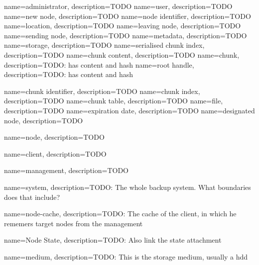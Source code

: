 {
	name={administrator},
	description={TODO}
}
{
	name={user},
	description={TODO}
}
{
	name={new node},
	description={TODO}
}
{
	name={node identifier},
	description={TODO}
}
{
	name={location},
	description={TODO}
}
{
	name={leaving node},
	description={TODO}
}
{
	name={sending node},
	description={TODO}
}
{
	name={metadata},
	description={TODO}
}
{
	name={storage},
	description={TODO}
}
{
	name={serialised chunk index},
	description={TODO}
}
{
	name={chunk content},
	description={TODO}
}
{
	name={chunk},
	description={TODO: has content and hash}
}
{
	name={root handle},
	description={TODO: has content and hash}
}

{
	name={chunk identifier},
	description={TODO}
}
{
	name={chunk index},
	description={TODO}
}
{
	name={chunk table},
	description={TODO}
}
{
	name={file},
	description={TODO}
}
{
	name={expiration date},
	description={TODO}
}
{
	name={designated node},
	description={TODO}
}

{
	name={node},
	description={TODO}
}

{
	name={client},
	description={TODO}
}

{
	name={management},
	description={TODO}
}

{
    name={system},
    description={TODO: The whole backup system. What boundaries does that include?}
}

{
    name={node-cache},
    description={TODO: The cache of the client, in which he rememers target nodes from the management}
}

{
    name={Node State},
    description={TODO: Also link the state attachment}
}

{
    name={medium},
    description={TODO: This is the storage medium, usually a hdd}
}